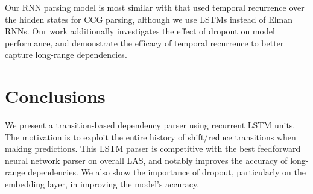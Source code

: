 Our RNN parsing model is most similar with  that used temporal recurrence over the hidden states for CCG parsing, although we use LSTMs instead of Elman RNNs. Our work additionally investigates the effect of dropout on model performance, and demonstrate the efficacy of temporal recurrence to better capture long-range dependencies.

\section{Conclusions}

We present a transition-based dependency parser using recurrent LSTM units. The motivation is to exploit the entire history of shift/reduce transitions when making predictions. This LSTM parser is competitive with the best feedforward neural network parser \cite{chenmanning14} on overall LAS, and notably improves the accuracy of long-range dependencies. We also show the importance of dropout, particularly on the embedding layer, in improving the model's accuracy.%





